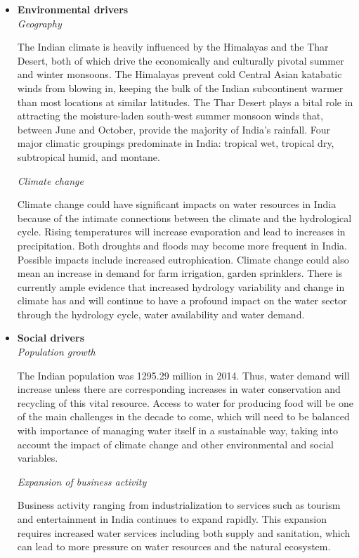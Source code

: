 \documentclass[tcn = 45538, sheet = true, abstract = true]{mcmthesis}
\begin{document}
\begin{itemize}
\item \textbf{Environmental drivers} \\

\emph{Geography} 

The Indian climate is heavily influenced by the Himalayas and the Thar Desert, 
both of which drive the economically and culturally pivotal summer and winter monsoons. 
The Himalayas prevent cold Central Asian katabatic winds from blowing in, 
keeping the bulk of the Indian subcontinent warmer than most locations at similar latitudes. 
The Thar Desert plays a bital role in attracting the moisture-laden south-west summer monsoon winds that, 
between June and October, provide the majority of India's rainfall. 
Four major climatic groupings predominate in India: 
tropical wet, 
tropical dry, 
subtropical humid, 
and montane. 

\emph{Climate change}

Climate change could have significant impacts on water resources in India because of the intimate connections between the climate and the hydrological cycle. 
Rising temperatures will increase evaporation and lead to increases in precipitation. 
Both droughts and floods may become more frequent in India. 
Possible impacts include increased eutrophication. 
Climate change could also mean an increase in demand for farm irrigation, 
garden sprinklers. 
There is currently ample evidence that increased hydrology variability and change in climate has and will continue to have a profound impact on the water sector through the hydrology cycle, 
water availability and water demand.

\item \textbf{Social drivers} \\

\emph{Population growth} 

The Indian population was 1295.29 million in 2014. 
Thus, 
water demand will increase unless there are corresponding increases in water conservation and recycling of this vital resource. 
Access to water for producing food will be one of the main challenges in the decade to come, 
which will need to be balanced with importance of managing water itself in a sustainable way, 
taking into account the impact of climate change and other environmental and social variables. 

\emph{Expansion of business activity} 

Business activity ranging from industrialization to services such as tourism and entertainment in India continues to expand rapidly. 
This expansion requires increased water services including both supply and sanitation, 
which can lead to more pressure on water resources and the natural ecosystem.


\end{itemize}
\end{document}

